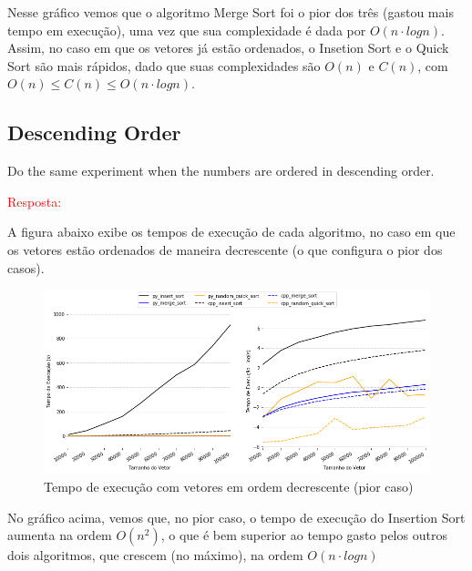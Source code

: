 \documentclass{article}
\begin{document}
    
    Nesse gráfico vemos que o algoritmo Merge Sort foi o pior dos três (gastou mais tempo em execução), uma vez que sua complexidade é dada por $O(n \cdot log n)$. Assim, no caso em que os vetores já estão ordenados, o Insetion Sort e o Quick Sort são mais rápidos, dado que suas complexidades são $O(n)$ e $C(n)$, com $O(n) \leq C(n) \leq O(n \cdot log n)$. 
        

\subsection{Descending Order}
Do the same experiment when the numbers are ordered in descending order.

\vspace{\baselineskip}

\textcolor{red}{Resposta:}

  A figura abaixo exibe os tempos de execução de cada algoritmo, no caso em que os vetores estão ordenados de maneira decrescente (o que configura o pior dos casos).  

\begin{figure}[!h]
    \centering
    \includegraphics[scale=0.5]{Figures/descending.png}
    \caption{Tempo de execução com vetores em ordem decrescente (pior caso)}
    \label{fig:graf-random}
\end{figure}

    No gráfico acima, vemos que, no pior caso, o tempo de execução do Insertion Sort aumenta na ordem $O(n^2)$, o que é bem superior ao tempo gasto pelos outros dois algoritmos, que crescem (no máximo), na ordem $O(n \cdot log n)$
\end{document}
